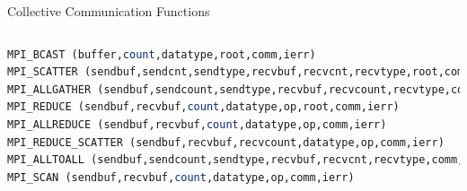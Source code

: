 \documentclass[9pt,c]{beamer}
\begin{document}
\begin{frame}{Collective Communication Functions}
\begin{block}{}
\begin{lstlisting}[basicstyle=\scriptsize\ttfamily,language=C]
  \end{lstlisting}
  \begin{lstlisting}[basicstyle=\scriptsize\ttfamily,language=Fortran]
MPI_BCAST (buffer,count,datatype,root,comm,ierr)
MPI_SCATTER (sendbuf,sendcnt,sendtype,recvbuf,recvcnt,recvtype,root,comm,ierr)MPI_GATHER (sendbuf,sendcnt,sendtype,recvbuf,recvcount,recvtype,root,comm,ierr)
MPI_ALLGATHER (sendbuf,sendcount,sendtype,recvbuf,recvcount,recvtype,comm,info)
MPI_REDUCE (sendbuf,recvbuf,count,datatype,op,root,comm,ierr)
MPI_ALLREDUCE (sendbuf,recvbuf,count,datatype,op,comm,ierr)
MPI_REDUCE_SCATTER (sendbuf,recvbuf,recvcount,datatype,op,comm,ierr)
MPI_ALLTOALL (sendbuf,sendcount,sendtype,recvbuf,recvcnt,recvtype,comm,ierr)
MPI_SCAN (sendbuf,recvbuf,count,datatype,op,comm,ierr)
  \end{lstlisting}
  \end{block}
\end{frame}
\end{document}

